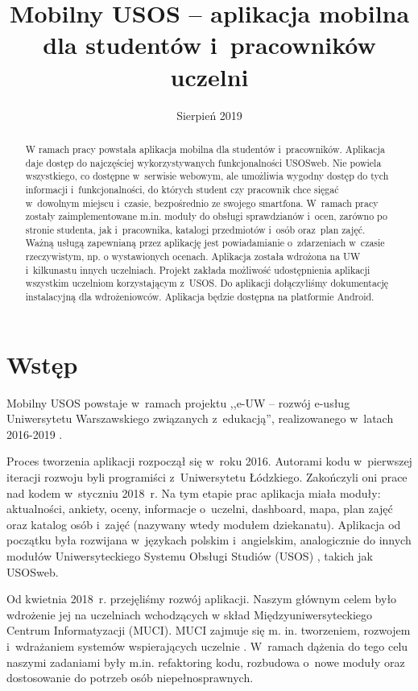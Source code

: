 \documentclass{pracamgr}
\title{Mobilny USOS -- aplikacja mobilna dla studentów i~pracowników uczelni}
\date{Sierpień 2019}
\begin{document}
\maketitle
\begin{abstract}
  W ramach pracy powstała aplikacja mobilna dla
  studentów i~pracowników. Aplikacja daje dostęp do najczęściej wykorzystywanych 
  funkcjonalności USOSweb. Nie powiela wszystkiego, co dostępne w~serwisie 
  webowym, ale umożliwia wygodny dostęp do tych informacji 
  i~funkcjonalności, do których student czy 
  pracownik chce sięgać w~dowolnym miejscu i~czasie, bezpośrednio ze swojego smartfona. 
  W~ramach pracy zostały zaimplementowane m.in. moduły do obsługi 
  sprawdzianów i~ocen, zarówno po stronie studenta, jak i~pracownika, katalogi
  przedmiotów i~osób oraz~plan zajęć. Ważną usługą zapewnianą przez 
  aplikację jest powiadamianie o~zdarzeniach w~czasie rzeczywistym, np. o wystawionych
  ocenach. Aplikacja została wdrożona na UW i~kilkunastu innych uczelniach. Projekt
  zakłada możliwość udostępnienia aplikacji wszystkim uczelniom korzystającym z~USOS.
  Do aplikacji dołączyliśmy dokumentację instalacyjną dla wdrożeniowców. Aplikacja
  będzie dostępna na platformie Android.
\end{abstract}

\tableofcontents

\setlength{\LTpost}{0pt} %

\chapter{Wstęp}

Mobilny USOS powstaje w~ramach projektu ,,e-UW – rozwój e-usług Uniwersytetu Warszawskiego
związanych z~edukacją'', realizowanego w~latach 2016-2019 \cite{euslugi}.

Proces tworzenia aplikacji rozpoczął się w~roku 2016. Autorami kodu w~pierwszej iteracji
rozwoju byli programiści z~Uniwersytetu Łódzkiego. Zakończyli oni prace nad kodem
w~styczniu 2018~r. Na tym etapie prac aplikacja miała moduły: aktualności, ankiety, oceny,
informacje o~uczelni, dashboard, mapa, plan zajęć oraz katalog osób i~zajęć (nazywany
wtedy modułem dziekanatu). Aplikacja od początku była rozwijana w~językach polskim
i~angielskim, analogicznie do innych modułów Uniwersyteckiego Systemu Obsługi Studiów (USOS)
\cite{usos}, takich jak USOSweb.

Od kwietnia 2018~r. przejęliśmy rozwój aplikacji. Naszym głównym celem
było wdrożenie jej na uczelniach wchodzących w skład Międzyuniwersyteckiego Centrum Informatyzacji (MUCI).
MUCI zajmuje się m. in. tworzeniem, rozwojem i~wdrażaniem systemów wspierających
uczelnie \cite{muci}. W~ramach dążenia do tego celu naszymi zadaniami
były m.in. refaktoring kodu, rozbudowa o~nowe moduły oraz dostosowanie do potrzeb osób 
niepełnosprawnych.
\end{document}
